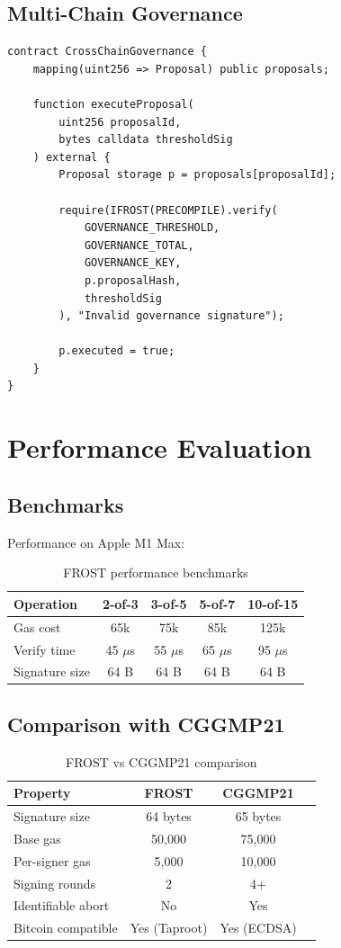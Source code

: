 \documentclass[11pt,a4paper]{article}
\theoremstyle{definition}
\begin{document}
\subsection{Multi-Chain Governance}

\begin{lstlisting}[language=Solidity]
contract CrossChainGovernance {
    mapping(uint256 => Proposal) public proposals;

    function executeProposal(
        uint256 proposalId,
        bytes calldata thresholdSig
    ) external {
        Proposal storage p = proposals[proposalId];

        require(IFROST(PRECOMPILE).verify(
            GOVERNANCE_THRESHOLD,
            GOVERNANCE_TOTAL,
            GOVERNANCE_KEY,
            p.proposalHash,
            thresholdSig
        ), "Invalid governance signature");

        p.executed = true;
    }
}
\end{lstlisting}

\section{Performance Evaluation}

\subsection{Benchmarks}

Performance on Apple M1 Max:

\begin{table}[h]
\centering
\begin{tabular}{lcccc}
\toprule
Operation & 2-of-3 & 3-of-5 & 5-of-7 & 10-of-15 \\
\midrule
Gas cost & 65k & 75k & 85k & 125k \\
Verify time & 45 $\mu$s & 55 $\mu$s & 65 $\mu$s & 95 $\mu$s \\
Signature size & 64 B & 64 B & 64 B & 64 B \\
\bottomrule
\end{tabular}
\caption{FROST performance benchmarks}
\end{table}

\subsection{Comparison with CGGMP21}

\begin{table}[h]
\centering
\begin{tabular}{lccc}
\toprule
Property & FROST & CGGMP21 \\
\midrule
Signature size & 64 bytes & 65 bytes \\
Base gas & 50,000 & 75,000 \\
Per-signer gas & 5,000 & 10,000 \\
Signing rounds & 2 & 4+ \\
Identifiable abort & No & Yes \\
Bitcoin compatible & Yes (Taproot) & Yes (ECDSA) \\
\bottomrule
\end{tabular}
\caption{FROST vs CGGMP21 comparison}
\end{table}
\end{document}
